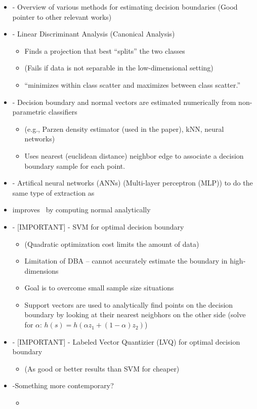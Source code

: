 \documentclass[12pt]{article}
\begin{document}
\begin{itemize}
	\item \cite{DiamantiniPotena2007} - Overview of various methods for
	estimating decision boundaries (Good pointer to other relevant works)
	\item  \cite{Fukunaga1990,ParkParkPardalos2004} - Linear Discriminant
	Analysis (Canonical Analysis)
	\begin{itemize}
		\item Finds a projection that best ``splits'' the two classes
		\item (Fails if data is not separable in the low-dimensional setting)
		\item ``minimizes within class scatter and maximizes between class
		scatter.''
	\end{itemize}
	\item \cite{LeeLandgrebe1993} - Decision boundary and normal vectors are
	estimated numerically from non-parametric classifiers
	\begin{itemize}
		\item  (e.g., Parzen density estimator (used in the paper), kNN, neural
		networks)
		\item Uses nearest (euclidean distance) neighbor edge to associate a
		decision boundary sample for each point.
	\end{itemize}
	\item \cite{LeeLandgrebe1997} - Artifical neural networks (ANNs)
	(Multi-layer perceptron (MLP)) to do the same type of extraction
	as~\cite{LeeLandgrebe1993}
	\item \cite{GoLee2003} improves~\cite{LeeLandgrebe1997} by computing normal
	analytically
	\item \cite{ZhangLiu2005} - [IMPORTANT] - SVM for optimal decision boundary
	\begin{itemize}
		\item (Quadratic optimization cost limits the amount of data)
		\item Limitation of DBA -- cannot accurately estimate the boundary in
		high-dimensions
		\item Goal is to overcome small sample size situations
		\item Support vectors are used to analytically find points on the
		decision boundary by looking at their nearest neigbhors on the other
		side (solve for $\alpha$: $h(s) = h(\alpha z_1 + (1 - \alpha) z_2)$)
	\end{itemize}
	\item \cite{DiamantiniPotena2006} - [IMPORTANT] - Labeled Vector Quantizier
	(LVQ) for optimal decision boundary 
	\begin{itemize}
		\item (As good or better results than SVM for cheaper) 
	\end{itemize}
	\item \cite{WooLee2017} -Something more contemporary?
	\begin{itemize}
		\item
	\end{itemize}
\end{itemize}
\end{document}
